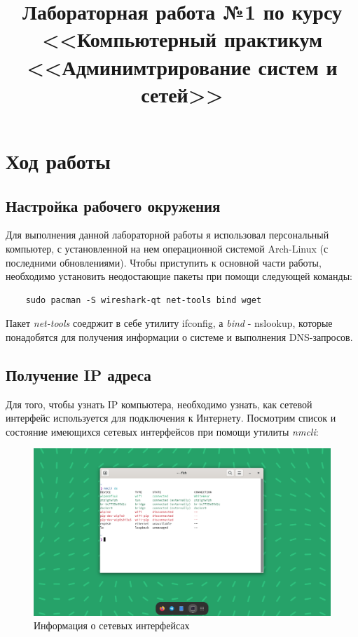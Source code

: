\documentclass[a4paper]{article}
\title{
  Лабораторная работа №1 по курсу \\
  <<Компьютерный практикум <<Админимтрирование систем и сетей>>  
}
\begin{document}
  \templatedtitlepage
  
  \toc
  \section{Ход работы}

  \subsection{Настройка рабочего окружения}

  Для выполнения данной лабораторной работы я использовал персональный компьютер,
  с установленной на нем операционной системой Arch-Linux (с последними обновлениями).
  Чтобы приступить к основной части работы, необходимо установить неодостающие пакеты при 
  помощи следующей команды:

  \begin{verbatim}
    sudo pacman -S wireshark-qt net-tools bind wget
  \end{verbatim}

  Пакет \textit{net-tools} соедржит в себе утилиту ifconfig, а \textit{bind} - nslookup, которые
  понадобятся для получения информации о системе и выполнения DNS-запросов.

  \subsection{Получение IP адреса}

  Для того, чтобы узнать IP компьютера, необходимо узнать, как сетевой интерфейс используется
  для подключения к Интернету. Посмотрим список и состояние имеющихся сетевых интерфейсов при 
  помощи утилиты \textit{nmcli}:

  \begin{figure}[H]
    \centering
    \includegraphics[width=1.0\textwidth]{01_0001}
    \caption{Информация о сетевых интерфейсах}
    \label{img:0001}
  \end{figure}
\end{document}
